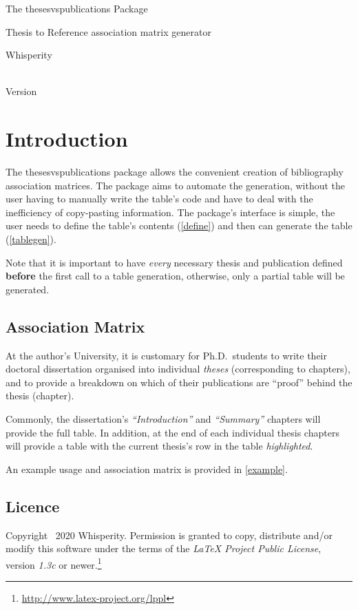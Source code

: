 \documentclass{article}
\begin{document}
\vspace*{0in}
\begin{center}
    \LARGE The \textsf{thesesvspublications} Package \\
    \small \rule{0in}{1em} Thesis to Reference association matrix generator \\
    \large \rule{0in}{2em} Whisperity \\
    \rule{0em}{2em}\thesesvspublicationsReleaseDate \\
    Version \thesesvspublicationsVersion
\end{center}

\tableofcontents

\section{Introduction}\label{intro}
The \textsf{thesesvspublications} package allows the convenient creation of bibliography association matrices.
The package aims to automate the generation, without the user having to manually write the table's code and have to deal with the inefficiency of copy-pasting information.
The package's interface is simple, the user needs to define the table's contents (\cref{define}) and then can generate the table (\cref{tablegen}).

Note that it is important to have \emph{every} necessary thesis and publication defined \textbf{before} the first call to a table generation, otherwise, only a partial table will be generated.

\subsection{Association Matrix}\label{association-mx}
At the author's University, it is customary for Ph.D.\ students to write their doctoral dissertation organised into individual \emph{theses} (corresponding to chapters), and to provide a breakdown on which of their publications are ``proof'' behind the thesis (chapter).

Commonly, the dissertation's \emph{``Introduction''} and \emph{``Summary''} chapters will provide the full table.
In addition, at the end of each individual thesis chapters will provide a table with the current thesis's row in the table \emph{highlighted}.

An example usage and association matrix is provided in \cref{example}.

\subsection{Licence}
Copyright \textcopyright\ 2020 Whisperity.
Permission is granted to copy, distribute and\slash or modify this software under the terms of the \emph{\LaTeX{} Project Public License}, version \emph{1.3c} or newer.\footnote{%
    \url{http://www.latex-project.org/lppl}%
}
\end{document}
